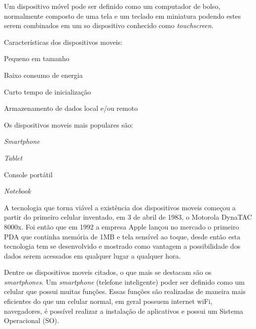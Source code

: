 Um dispositivo móvel pode ser definido como um computador de bolso, normalmente composto de uma tela e um teclado em miniatura podendo estes serem combinados em um so dispositivo conhecido como \textit{ touchscreen}.

Características dos dispositivos moveis:

\begin{alineascomponto}
 
\item Pequeno em tamanho
\item Baixo consumo de energia
\item Curto tempo de inicialização
\item Armazenamento de dados local e/ou remoto

	\end{alineascomponto}


Os dispositivos moveis mais populares são:

\begin{alineascomponto}
 
\item \textit{Smartphone}
\item \textit {Tablet}
\item Console portátil
\item \textit {Notebook}

	\end{alineascomponto}
	\cite{mov}

A tecnologia que torna viável a existência dos dispositivos moveis começou a partir do primeiro celular inventado, em 3 de abril de 1983, o Motorola DynaTAC 8000x. Foi então que em 1992 a empresa Apple lançou no mercado o primeiro PDA que continha memória de 1MB e tela sensível ao toque, desde então esta tecnologia tem se desenvolvido e mostrado como vantagem  a possibilidade dos dados serem acessados em qualquer lugar a qualquer hora. \cite{1cel}

Dentre os dispositivos moveis citados, o que mais se destacam são os \textit{smartphones}. Um \textit{smartphone} (telefone inteligente) poder ser definido como um celular que possui muitas funções. Essas funções são realizadas de maneira mais eficientes do que um celular normal, em geral possuem internet wiFi, navegadores, é possível realizar a instalação de aplicativos e possui um Sistema Operacional (SO). \cite{smar} 


